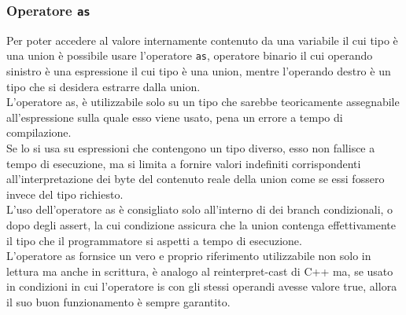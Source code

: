 \subsubsection{Operatore \texttt{as}}
Per poter accedere al valore internamente contenuto da una variabile il cui tipo è una union è possibile usare 
l’operatore \texttt{as}, operatore binario il cui operando sinistro è una espressione il cui tipo è una union, mentre l’operando destro 
è un tipo che si desidera estrarre dalla union. \\

L’operatore as, è utilizzabile solo su un tipo che sarebbe teoricamente assegnabile all’espressione sulla quale esso viene usato, 
pena un errore a tempo di compilazione. \\

Se lo si usa su espressioni che contengono un tipo diverso, esso non fallisce a tempo di esecuzione, ma si limita a fornire valori 
indefiniti corrispondenti all’interpretazione dei byte del contenuto reale della union come se essi fossero invece del tipo richiesto. \\

L’uso dell’operatore as è consigliato solo all’interno di dei branch condizionali, o dopo degli assert, la cui condizione assicura che la union
contenga effettivamente il tipo che il programmatore si aspetti a tempo di esecuzione. \\   

L’operatore as fornsice un vero e proprio riferimento utilizzabile non solo in lettura ma anche in scrittura, 
è analogo al reinterpret-cast di C++ ma, se usato in condizioni in cui l’operatore is con gli stessi operandi 
avesse valore true, allora il suo buon funzionamento è sempre garantito.